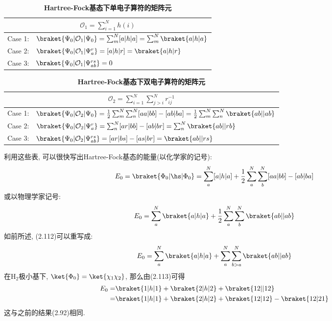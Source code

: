 \begin{table}[h]
	\renewcommand\arraystretch{1.7}
	\centering
	\caption{\bf Hartree-Fock基态下单电子算符的矩阵元}
	\label{t2.5}
	\begin{tabularx}{\textwidth}{lY}
		\hline
		\\\hline
		Case 1: & $\braket{\Psi_0|\mathcal{O}_1|\Psi_0} = \sum_m^N [a|h|a]=\sum_m^N\braket{a|h|a}$\\
		Case 2: & $\braket{\Psi_0|\mathcal{O}_1|\Psi_a^r} = [a|h|r]=\braket{a|h|r}$\\
		Case 3: & $\braket{\Psi_0|\mathcal{O}_1|\Psi_{ab}^{rs}} = 0$\\\hline
	\end{tabularx}
\end{table}

\begin{table}[h]
	\renewcommand\arraystretch{1.7}
	\centering
	\caption{\bf Hartree-Fock基态下双电子算符的矩阵元}
	\label{t2.6}
	\begin{tabularx}{\textwidth}{lY}
		\hline
		\\\hline
		Case 1: & $\braket{\Psi_0|\mathcal{O}_2|\Psi_0} = \frac{1}{2}\sum_m^N\sum_n^N [aa|bb]-[ab|ba]=\frac{1}{2}\sum_m^N\sum_n^N\braket{ab||ab}$\\
		Case 2: & $\braket{\Psi_0|\mathcal{O}_2|\Psi_a^r} = \sum_n^N[ar|bb]-[ab|br]=\sum_n^N\braket{ab||rb}$\\
		Case 3: & $\braket{\Psi_0|\mathcal{O}_2|\Psi_{ab}^{rs}} = [ar|bs]-[as|br]=\braket{ab||rs}$\\\hline
	\end{tabularx}
\end{table}

利用这些表, 
可以很快写出Hartree-Fock基态的能量(以化学家的记号):
\begin{equation}
E_0 = \braket{\Phi_0|\hs|\Phi_0} = \sum_{a}^{N}[a|h|a] + \frac{1}{2}\sum_{a}^{N}\sum_{b}^{N}[aa|bb]-[ab|ba]
\end{equation}  
或以物理学家记号:
\begin{equation}
E_0 = \sum_{a}^{N}\braket{a|h|a} + \frac{1}{2}\sum_{a}^{N}\sum_{b}^{N}\braket{ab||ab}
\end{equation}
如前所述, 
(2.112)可以重写成:
\begin{equation}
E_0 = \sum_{a}^{N}\braket{a|h|a} + \sum_{a}^{N}\sum_{b>a}^{N}\braket{ab||ab}
\end{equation}
在$\mathrm{H}_2$极小基下, 
$\ket{\Phi_0}=\ket{\chi_1\chi_2}$, 
那么由(2.113)可得
\begin{align}
E_0 =& \braket{1|h|1} + \braket{2|h|2} + \braket{12||12}\notag\\
    =& \braket{1|h|1} + \braket{2|h|2} + \braket{12|12} - \braket{12|21}
\end{align}
这与之前的结果(2.92)相同.


